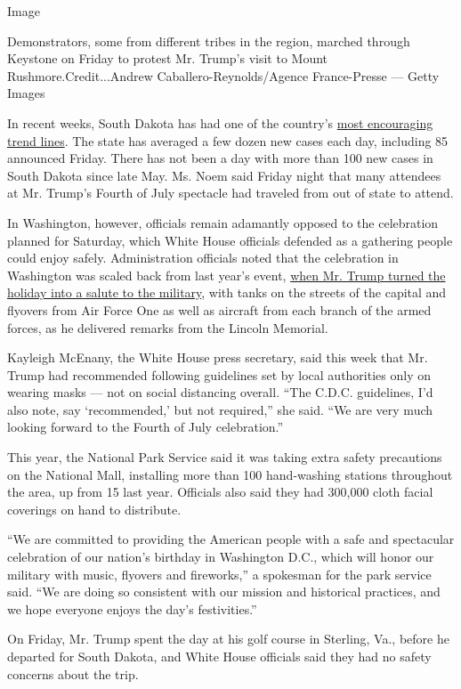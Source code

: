 Image

Demonstrators, some from different tribes in the region, marched through
Keystone on Friday to protest Mr. Trump's visit to Mount
Rushmore.Credit...Andrew Caballero-Reynolds/Agence France-Presse ---
Getty Images

In recent weeks, South Dakota has had one of the country's
\href{https://www.nytimes.com/interactive/2020/us/south-dakota-coronavirus-cases.html}{most
encouraging trend lines}. The state has averaged a few dozen new cases
each day, including 85 announced Friday. There has not been a day with
more than 100 new cases in South Dakota since late May. Ms. Noem said
Friday night that many attendees at Mr. Trump's Fourth of July spectacle
had traveled from out of state to attend.

In Washington, however, officials remain adamantly opposed to the
celebration planned for Saturday, which White House officials defended
as a gathering people could enjoy safely. Administration officials noted
that the celebration in Washington was scaled back from last year's
event,
\href{https://www.nytimes.com/2019/07/02/us/politics/trump-tanks.html}{when
Mr. Trump turned the holiday into a salute to the military}, with tanks
on the streets of the capital and flyovers from Air Force One as well as
aircraft from each branch of the armed forces, as he delivered remarks
from the Lincoln Memorial.

Kayleigh McEnany, the White House press secretary, said this week that
Mr. Trump had recommended following guidelines set by local authorities
only on wearing masks --- not on social distancing overall. ``The C.D.C.
guidelines, I'd also note, say `recommended,' but not required,'' she
said. ``We are very much looking forward to the Fourth of July
celebration.''

This year, the National Park Service said it was taking extra safety
precautions on the National Mall, installing more than 100 hand-washing
stations throughout the area, up from 15 last year. Officials also said
they had 300,000 cloth facial coverings on hand to distribute.

``We are committed to providing the American people with a safe and
spectacular celebration of our nation's birthday in Washington D.C.,
which will honor our military with music, flyovers and fireworks,'' a
spokesman for the park service said. ``We are doing so consistent with
our mission and historical practices, and we hope everyone enjoys the
day's festivities.''

On Friday, Mr. Trump spent the day at his golf course in Sterling, Va.,
before he departed for South Dakota, and White House officials said they
had no safety concerns about the trip.

